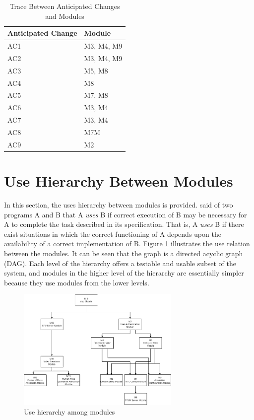 \documentclass[12pt, titlepage]{article}
\begin{document}
\begin{table}[H]
  \centering
  \begin{tabular}{p{} p{}}
  \toprule
  \textbf{Anticipated Change} & \textbf{Module}\\
  \midrule
  AC1 & M3, M4, M9\\
  AC2 & M3, M4, M9\\
  AC3 & M5, M8\\
  AC4 & M8\\
  AC5 & M7, M8\\
  AC6 & M3, M4\\
  AC7 & M3, M4\\
  AC8 & M7M\\
  AC9 & M2\\
  \bottomrule
  \end{tabular}
  \caption{Trace Between Anticipated Changes and Modules}
  \label{TblACM}
  \end{table}

\section{Use Hierarchy Between Modules} \label{SecUse}

In this section, the uses hierarchy between modules is
provided. \citet{Parnas1978} said of two programs A and B that A {\em uses} B if
correct execution of B may be necessary for A to complete the task described in
its specification. That is, A {\em uses} B if there exist situations in which
the correct functioning of A depends upon the availability of a correct
implementation of B.  Figure \ref{FigUH} illustrates the use relation between
the modules. It can be seen that the graph is a directed acyclic graph
(DAG). Each level of the hierarchy offers a testable and usable subset of the
system, and modules in the higher level of the hierarchy are essentially simpler
because they use modules from the lower levels.

\begin{figure}[H]
    \centering
    \includegraphics[width=0.7\textwidth]{UsesHierarchy.png}
    \caption{Use hierarchy among modules}
    \label{FigUH}
    \end{figure}
\end{document}
